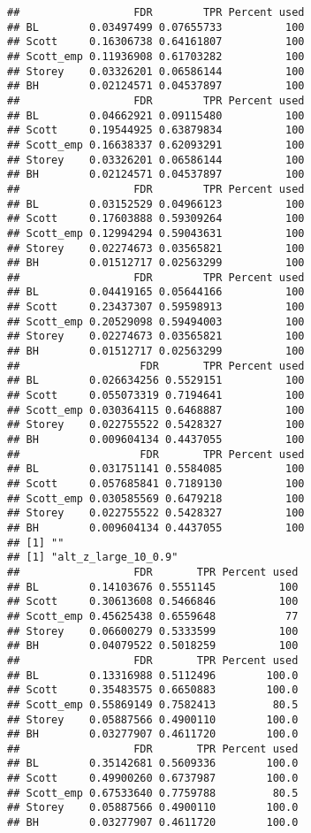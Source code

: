 \documentclass{article}\usepackage[]{graphicx}\usepackage[]{color}
\makeatletter
\newenvironment{kframe}{%
 \def\at@end@of@kframe{}%
 \ifinner\ifhmode%
  \def\at@end@of@kframe{\end{minipage}}%
  \begin{minipage}{\columnwidth}%
 \fi\fi%
 \def\FrameCommand##1{\hskip\@totalleftmargin \hskip-\fboxsep
 \colorbox{shadecolor}{##1}\hskip-\fboxsep
     \hskip-\linewidth \hskip-\@totalleftmargin \hskip\columnwidth}%
 \MakeFramed {\advance\hsize-\width
   \@totalleftmargin\z@ \linewidth\hsize
   \@setminipage}}%
 {\par\unskip\endMakeFramed%
 \at@end@of@kframe}
\newenvironment{knitrout}{}{} %
\makeatother
\begin{document}
\begin{knitrout}
\begin{kframe}
\begin{verbatim}
##                  FDR        TPR Percent used
## BL        0.03497499 0.07655733          100
## Scott     0.16306738 0.64161807          100
## Scott_emp 0.11936908 0.61703282          100
## Storey    0.03326201 0.06586144          100
## BH        0.02124571 0.04537897          100
##                  FDR        TPR Percent used
## BL        0.04662921 0.09115480          100
## Scott     0.19544925 0.63879834          100
## Scott_emp 0.16638337 0.62093291          100
## Storey    0.03326201 0.06586144          100
## BH        0.02124571 0.04537897          100
##                  FDR        TPR Percent used
## BL        0.03152529 0.04966123          100
## Scott     0.17603888 0.59309264          100
## Scott_emp 0.12994294 0.59043631          100
## Storey    0.02274673 0.03565821          100
## BH        0.01512717 0.02563299          100
##                  FDR        TPR Percent used
## BL        0.04419165 0.05644166          100
## Scott     0.23437307 0.59598913          100
## Scott_emp 0.20529098 0.59494003          100
## Storey    0.02274673 0.03565821          100
## BH        0.01512717 0.02563299          100
##                   FDR       TPR Percent used
## BL        0.026634256 0.5529151          100
## Scott     0.055073319 0.7194641          100
## Scott_emp 0.030364115 0.6468887          100
## Storey    0.022755522 0.5428327          100
## BH        0.009604134 0.4437055          100
##                   FDR       TPR Percent used
## BL        0.031751141 0.5584085          100
## Scott     0.057685841 0.7189130          100
## Scott_emp 0.030585569 0.6479218          100
## Storey    0.022755522 0.5428327          100
## BH        0.009604134 0.4437055          100
## [1] ""
## [1] "alt_z_large_10_0.9"
##                  FDR       TPR Percent used
## BL        0.14103676 0.5551145          100
## Scott     0.30613608 0.5466846          100
## Scott_emp 0.45625438 0.6559648           77
## Storey    0.06600279 0.5333599          100
## BH        0.04079522 0.5018259          100
##                  FDR       TPR Percent used
## BL        0.13316988 0.5112496        100.0
## Scott     0.35483575 0.6650883        100.0
## Scott_emp 0.55869149 0.7582413         80.5
## Storey    0.05887566 0.4900110        100.0
## BH        0.03277907 0.4611720        100.0
##                  FDR       TPR Percent used
## BL        0.35142681 0.5609336        100.0
## Scott     0.49900260 0.6737987        100.0
## Scott_emp 0.67533640 0.7759788         80.5
## Storey    0.05887566 0.4900110        100.0
## BH        0.03277907 0.4611720        100.0

\end{verbatim}
\end{kframe}
\end{knitrout}
\end{document}
